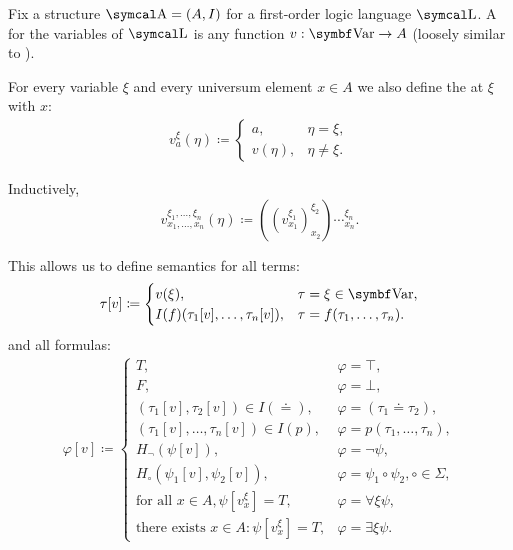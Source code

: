 \begin{definition}\label{def:first_order_variable_assignment}\cite[definition 14.32]{OpenLogic20201202}
  Fix a structure \( \CA = (A, I) \) for a first-order logic language \( \CL \). A  for the variables of \( \CL \) is any function \( v: \Bold{Var} \to A \) (loosely similar to ).

  For every variable \( \xi \) and every universum element \( x \in A \) we also define the  at \( \xi \) with \( x \):
  \begin{align*}
    v_a^\xi(\eta) \coloneqq \begin{cases}
      a,    &\eta = \xi, \\
      v(\eta), &\eta \neq \xi.
    \end{cases}
  \end{align*}

  Inductively,
  \begin{equation*}
    v_{x_1, \ldots, x_n}^{\xi_1, \ldots, \xi_n}(\eta) \coloneqq ((v_{x_1}^{\xi_1})_{x_2}^{\xi_2})\cdots_{x_n}^{\xi_n}.
  \end{equation*}

  This allows us to define semantics for all terms:
  \begin{align*}
    \tau[v] \coloneqq \begin{cases}
      v(\xi),                               &\tau = \xi \in \Bold{Var}, \\
      I(f)(\tau_1[v], \ldots, \tau_n[v]),   &\tau = f(\tau_1, \ldots, \tau_n).
    \end{cases}
  \end{align*}
  and all formulas:
  \begin{align*}
    \varphi[v] \coloneqq \begin{cases}
      T,                                                &\varphi = \top, \\
      F,                                                &\varphi = \bot, \\
      (\tau_1[v], \tau_2[v]) \in I(\doteq),             &\varphi = (\tau_1 \doteq \tau_2), \\
      (\tau_1[v], \ldots, \tau_n[v]) \in I(p),          &\varphi = p(\tau_1, \ldots, \tau_n), \\
      H_\neg(\psi[v]),                                  &\varphi = \neg \psi, \\
      H_\circ(\psi_1[v], \psi_2[v]),                    &\varphi = \psi_1 \circ \psi_2, \circ \in \Sigma, \\
      \text{for all } x \in A, \psi[v_x^\xi] = T,       &\varphi = \forall \xi \psi, \\
      \text{there exists } x \in A: \psi[v_x^\xi] = T,  &\varphi = \exists \xi \psi.
    \end{cases}
  \end{align*}


\end{definition}
